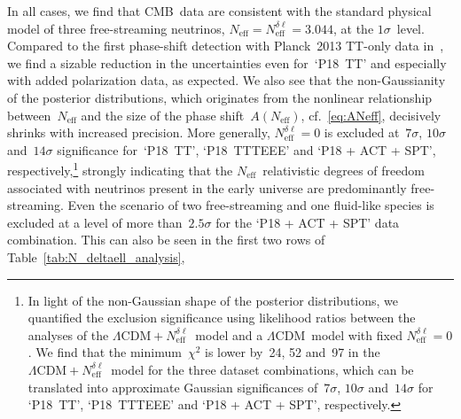 \documentclass[11pt]{article}
\numberwithin{equation}{section}
\newcommand{\Neff}{N_\mathrm{eff}}
\newcommand{\Nmultipole}{N_\mathrm{eff}^{\delta\ell}}
\begin{document}
In all cases, we find that CMB~data are consistent with the standard physical model of three free-streaming neutrinos, $\Neff = \Nmultipole = 3.044$, at the $1\sigma$~level. Compared to the first phase-shift detection with Planck~2013 TT-only data in~\cite{Follin:2015hya}, we find a sizable reduction in the uncertainties even for~`P18~TT' and especially with added polarization data, as expected. We also see that the non-Gaussianity of the posterior distributions, which originates from the nonlinear relationship between~$\Neff$ and the size of the phase shift~$A(\Neff)$, cf.~\eqref{eq:ANeff}, decisively shrinks with increased precision. More generally, $\Nmultipole = 0$ is excluded at~$7\sigma$, $10\sigma$ and~$14\sigma$ significance for~`P18~TT', `P18~TTTEEE' and `P18 + ACT + SPT', respectively,\footnote{In light of the non-Gaussian shape of the posterior distributions, we quantified the exclusion significance using likelihood ratios between the analyses of the $\Lambda\mathrm{CDM} + \Nmultipole$~model and a $\Lambda\mathrm{CDM}$~model with fixed $\Nmultipole = 0$. We find that the minimum~$\chi^2$ is lower by~24, 52 and~97 in the $\Lambda\mathrm{CDM} + \Nmultipole$~model for the three dataset combinations, which can be translated into approximate Gaussian significances of~$7\sigma$, $10\sigma$ and~$14\sigma$ for `P18~TT', `P18~TTTEEE' and `P18 + ACT + SPT', respectively.\label{fn:significance}} strongly indicating that the $\Neff$~relativistic degrees of freedom associated with neutrinos present in the early universe are predominantly free-streaming. Even the scenario of two free-streaming and one fluid-like species is excluded at a level of more than~$2.5\sigma$ for the `P18 + ACT + SPT' data combination. This can also be seen in the first two rows of Table~\ref{tab:N_deltaell_analysis},%
\end{document}
